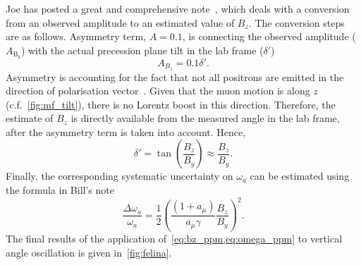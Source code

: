 \documentclass[12pt]{article}
\begin{document}
\clearpage
\thispagestyle{plain}
Joe has posted a great and comprehensive note~\cite{Joe_Gleb}, which deals with a conversion from an observed amplitude to an estimated value of $B_z$. The conversion steps are as follows. Asymmetry term, $A=0.1$, is connecting the observed amplitude ($A_{\mathrm{B_z}}$) with the actual precession plane tilt in the lab frame ($\delta '$)
\begin{equation}
    A_{B_z}=0.1\delta '.
\end{equation}
Asymmetry is accounting for the fact that not all positrons are emitted in the direction of polarisation vector~\cite{Joe_Gleb}. Given that the muon motion is along $z$ (c.f.~\cref{fig:mf_tilt}), there is no Lorentz boost in this direction. Therefore, the estimate of $B_z$ is directly available from the measured angle in the lab frame, after the asymmetry term is taken into account. Hence, 
\begin{equation}
    \delta ' = \tan(\frac{B_z}{B_y})  \approx \frac{B_z}{B_y}.
    \label{eq:bz_ppm}
\end{equation}
Finally, the corresponding systematic uncertainty on $\omega_a$ can be estimated using the formula in Bill's note~\cite{Bill}
\begin{equation}
    \frac{\Delta \omega_a}{\omega_a} = \frac{1}{2}\left(\frac{(1+a_{\mu})}{a_{\mu}\gamma}\frac{B_z}{B_y}\right)^2.
    \label{eq:omega_ppm}
\end{equation}
The final results of the application of~\cref{eq:bz_ppm,eq:omega_ppm} to  vertical angle oscillation is given in~\cref{fig:felina}.

\clearpage
\thispagestyle{plain} 
\end{document}
